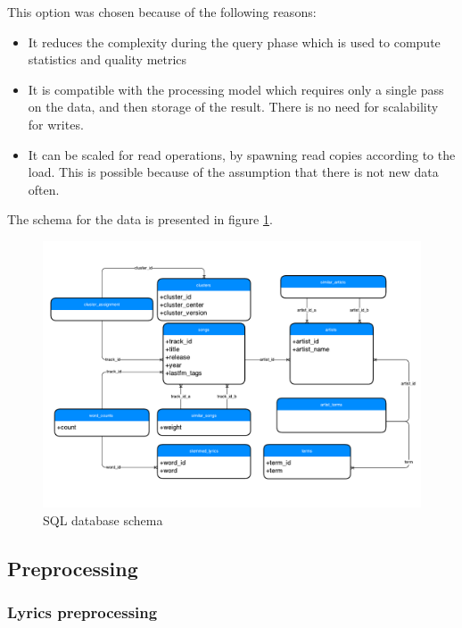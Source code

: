 \documentclass[10pt,a4paper, twocolumn]{article}
\begin{document}
    This option was chosen because of the following reasons:
 
    \begin{itemize}
      \item It reduces the complexity during the query phase which is used to
            compute statistics and quality metrics
      \item It is compatible with the processing model which requires only a
            single pass on the data, and then storage of the result. There
            is no need for scalability for writes.
      \item It can be scaled for read operations, by spawning read copies
            according to the load. This is possible because of the assumption
            that there is not new data often.
    \end{itemize}        
 
    The schema for the data is presented in figure \ref{fig:data_schema}.
 
    \begin{figure}
      \centering
      \includegraphics[width=\columnwidth]{img/database}
      \caption{SQL database schema}
      \label{fig:data_schema}
    \end{figure}        

    \subsection{Preprocessing}
    \subsubsection{Lyrics preprocessing}
    \label{sec:preprocessing}
\end{document}
